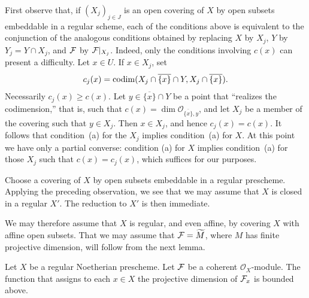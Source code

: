 First observe that, if $(X_j)_{j\in J}$ is an open covering of $X$ by open
subsets embeddable in a regular scheme, each of the conditions above is
equivalent to the conjunction of the analogous conditions obtained by
replacing $X$ by $X_j$, $Y$ by $Y_j=Y\cap X_j$, and $\cF$ by
$\cF|_{X_j}$. Indeed, only the conditions involving $c(x)$ can present a
difficulty. Let $x\in U$. If $x\in X_j$, set
\[
  c_j(x)=\operatorname{codim}(X_j\cap\overline{\{x\}}\cap Y,
                X_j\cap\overline{\{x\}}).
\]
Necessarily $c_j(x)\geq c(x)$. Let $y\in\overline{\{x\}}\cap Y$ be a point
that ``realizes the codimension,'' that is, such that
$c(x)=\dim\mathcal O_{\overline{\{x\}},y}$, and let $X_j$ be a member of
the covering such that $y\in X_j$. Then $x\in X_j$, and hence
$c_j(x)=c(x)$. It follows that condition~(a) for the $X_j$ implies
condition~(a) for $X$. At this point we have only a partial converse: condition
(a) for $X$ implies condition~(a) for those $X_j$ such that
$c(x)=c_j(x)$, which suffices for our purposes.%


\setcounter{section}{2}\setcounter{lemma}{3}

\medskip
Choose a covering of $X$ by open subsets embeddable in a regular prescheme.
Applying the preceding observation, we see that we may assume that $X$ is
closed in a regular $X'$. The reduction to $X'$ is then immediate.

We may therefore assume that $X$ is regular, and even affine, by covering
$X$ with affine open subsets. That we may assume that $\cF=\widetilde M$, where
$M$ has finite projective dimension, will follow from the next lemma.

\begin{lemma}\label{VIII.2.4}
Let $X$ be a regular Noetherian prescheme. Let $\cF$ be a coherent
$\mathcal O_X$-module. The function that assigns to each $x\in X$ the
projective dimension of $\cF_x$ is bounded above.
\end{lemma}


